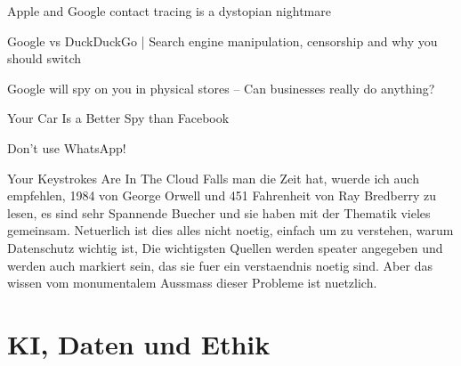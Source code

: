 \documentclass{report}
\begin{document}
Apple and Google contact tracing is a dystopian nightmare \citep{contact-tracing}

Google vs DuckDuckGo | Search engine manipulation, censorship and why you should switch \citep{google-DuckDuckGo}

Google will spy on you in physical stores – Can businesses really do anything? \citep{offline-tracking-google}

Your Car Is a Better Spy than Facebook \citep{car-better-spy-than-facebook}

Don't use WhatsApp!\citep{dont-use-whatsapp}

Your Keystrokes Are In The Cloud \citep{you-keystrokes-are-in-the-cloud}
\newline
Falls man die Zeit hat, wuerde ich auch empfehlen, 1984 von George Orwell und 451 Fahrenheit von Ray Bredberry zu lesen, es sind sehr Spannende Buecher und sie haben mit der Thematik vieles gemeinsam.
Netuerlich ist dies alles nicht noetig, einfach um zu verstehen, warum Datenschutz wichtig ist, Die wichtigsten Quellen werden speater angegeben und werden auch markiert sein, das sie fuer ein verstaendnis noetig sind. Aber das wissen vom monumentalem Aussmass dieser Probleme ist nuetzlich. 
\chapter{KI, Daten und Ethik}
\end{document}
